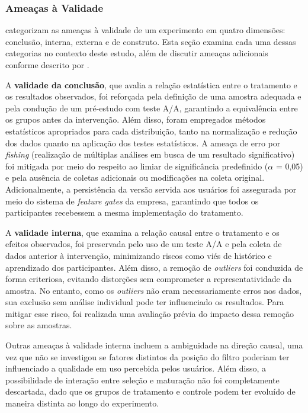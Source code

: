 \subsubsection{Ameaças à Validade}

 categorizam as ameaças à validade de um experimento em quatro dimensões: conclusão, interna, externa e de construto. Esta seção examina cada uma dessas categorias no contexto deste estudo, além de discutir ameaças adicionais conforme descrito por .

A \textbf{validade da conclusão}, que avalia a relação estatística entre o tratamento e os resultados observados, foi reforçada pela definição de uma amostra adequada e pela condução de um pré-estudo com teste A/A, garantindo a equivalência entre os grupos antes da intervenção. Além disso, foram empregados métodos estatísticos apropriados para cada distribuição, tanto na normalização e redução dos dados quanto na aplicação dos testes estatísticos. A ameaça de erro por \textit{fishing} (realização de múltiplas análises em busca de um resultado significativo) foi mitigada por meio do respeito ao limiar de significância predefinido (\(\alpha\) = 0,05) e pela ausência de coletas adicionais ou modificações na coleta original. Adicionalmente, a persistência da versão servida aos usuários foi assegurada por meio do sistema de \textit{feature gates} da empresa, garantindo que todos os participantes recebessem a mesma implementação do tratamento.

A \textbf{validade interna}, que examina a relação causal entre o tratamento e os efeitos observados, foi preservada pelo uso de um teste A/A e pela coleta de dados anterior à intervenção, minimizando riscos como viés de histórico e aprendizado dos participantes. Além disso, a remoção de \textit{outliers} foi conduzida de forma criteriosa, evitando distorções sem comprometer a representatividade da amostra. No entanto, como os \textit{outliers} não eram necessariamente erros nos dados, sua exclusão sem análise individual pode ter influenciado os resultados. Para mitigar esse risco, foi realizada uma avaliação prévia do impacto dessa remoção sobre as amostras.

Outras ameaças à validade interna incluem a ambiguidade na direção causal, uma vez que não se investigou se fatores distintos da posição do filtro poderiam ter influenciado a qualidade em uso percebida pelos usuários. Além disso, a possibilidade de interação entre seleção e maturação não foi completamente descartada, dado que os grupos de tratamento e controle podem ter evoluído de maneira distinta ao longo do experimento.

